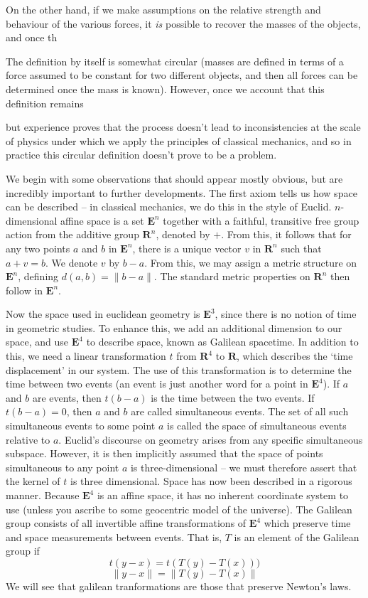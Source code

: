 On the other hand, if we make assumptions on the relative strength and behaviour of the various forces, it \emph{is} possible to recover the masses of the objects, and once th


The definition by itself is somewhat circular (masses are defined in terms of a force assumed to be constant for two different objects, and then all forces can be determined once the mass is known). However, once we account that this definition remains 

 but experience proves that the process doesn't lead to inconsistencies at the scale of physics under which we apply the principles of classical mechanics, and so in practice this circular definition doesn't prove to be a problem.





We begin with some observations that should appear mostly obvious, but are incredibly important to further developments. The first axiom tells us how space can be described -- in classical mechanics, we do this in the style of Euclid. $n$-dimensional affine space is a set $\mathbf{E}^n$ together with a faithful, transitive free group action from the additive group $\mathbf{R}^n$, denoted by $+$. From this, it follows that for any two points $a$ and $b$ in $\mathbf{E}^n$, there is a unique vector $v$ in $\mathbf{R}^n$ such that $a + v = b$. We denote $v$ by $b - a$. From this, we may assign a metric structure on $\mathbf{E}^n$, defining $d(a,b) = \| b - a \|$. The standard metric properties on $\mathbf{R}^n$ then follow in $\mathbf{E}^n$.

Now the space used in euclidean geometry is $\mathbf{E}^3$, since there is no notion of time in geometric studies. To enhance this, we add an additional dimension to our space, and use $\mathbf{E}^4$ to describe space, known as Galilean spacetime. In addition to this, we need a linear transformation $t$ from $\mathbf{R}^4$ to $\mathbf{R}$, which describes the `time displacement' in our system. The use of this transformation is to determine the time between two events (an event is just another word for a point in $\mathbf{E}^4$). If $a$ and $b$ are events, then $t(b - a)$ is the time between the two events. If $t(b - a) = 0$, then $a$ and $b$ are called simultaneous events. The set of all such simultaneous events to some point $a$ is called the space of simultaneous events relative to $a$. Euclid's discourse on geometry arises from any specific simultaneous subspace. However, it is then implicitly assumed that the space of points simultaneous to any point $a$ is three-dimensional -- we must therefore assert that the kernel of $t$ is three dimensional. Space has now been described in a rigorous manner.
%
Because $\mathbf{E}^4$ is an affine space, it has no inherent coordinate system to use (unless you ascribe to some geocentric model of the universe). The Galilean group consists of all invertible affine transformations of $\mathbf{E}^4$ which preserve time and space measurements between events. That is, $T$ is an element of the Galilean group if
%
\[ t(y - x) = t(T(y) - T(x))) \]
%
\[ \| y - x \| = \| T(y) - T(x) \| \]
%
We will see that galilean tranformations are those that preserve Newton's laws.


